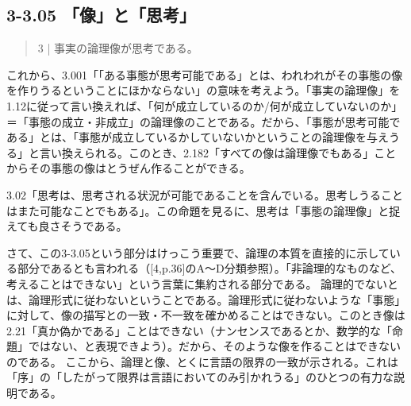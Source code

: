 \documentclass[11pt,a4paper]{jsarticle}
\begin{document}
\subsection{3-3.05 「像」と「思考」}
\begin{quote}
3 | 事実の論理像が思考である。
\end{quote}
これから、3.001「「ある事態が思考可能である」とは、われわれがその事態の像を作りうるということにほかならない」の意味を考えよう。「事実の論理像」を1.12に従って言い換えれば、「何が成立しているのか/何が成立していないのか」＝「事態の成立・非成立」の論理像のことである。だから、「事態が思考可能である」とは、「事態が成立しているかしていないかということの論理像を与えうる」と言い換えられる。このとき、2.182「すべての像は論理像でもある」ことからその事態の像はとうぜん作ることができる。

3.02「思考は、思考される状況が可能であることを含んでいる。思考しうることはまた可能なことでもある」。この命題を見るに、思考は「事態の論理像」と捉えても良さそうである。

さて、この3-3.05という部分はけっこう重要で、論理の本質を直接的に示している部分であるとも言われる（[4,p.36]のA〜D分類参照）。「非論理的なものなど、考えることはできない」という言葉に集約される部分である。
論理的でないとは、論理形式に従わないということである。論理形式に従わないような「事態」に対して、像の描写との一致・不一致を確かめることはできない。このとき像は2.21「真か偽かである」ことはできない（ナンセンスであるとか、数学的な「命題」ではない、と表現できよう）。だから、そのような像を作ることはできないのである。
ここから、論理と像、とくに言語の限界の一致が示される。これは「序」の「したがって限界は言語においてのみ引かれうる」のひとつの有力な説明である。
\end{document}
